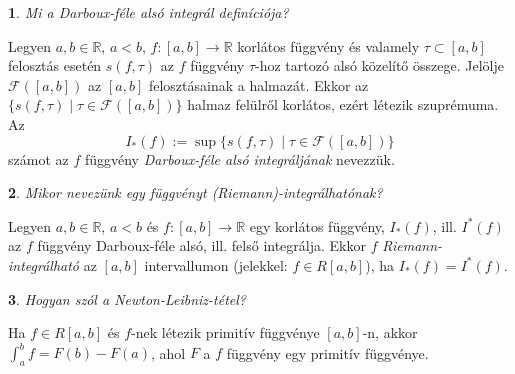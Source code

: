 \documentclass[a4paper]{article}
\def\R{\mathbb{R}}
\theoremstyle{qstyle}
\newtheorem{question}{}{}
\begin{document}
	\begin{question}
		Mi a \emph{Darboux-féle alsó integrál} definíciója?
	\end{question}
	Legyen $a,b \in \R$, $a<b$, $f:[a,b] \to \R$ korlátos függvény és valamely $\tau \subset [a,b]$ felosztás esetén $s(f,\tau)$ az $f$ függvény $\tau$-hoz tartozó alsó közelítő összege. Jelölje $\mathcal{F}([a,b])$ az $[a,b]$ felosztásainak a halmazát. Ekkor az $\{s(f,\tau) \mid \tau\in \mathcal{F}([a,b])\}$ halmaz felülről korlátos, ezért létezik szuprémuma. Az
	$$I_*(f) := \sup \{s(f,\tau) \mid \tau \in \mathcal{F}([a,b])\} $$
	számot az $f$ függvény \emph{Darboux-féle alsó integráljának} nevezzük.
	
	\begin{question}
		Mikor nevezünk egy függvényt (Riemann)-integrálhatónak?
	\end{question}
	Legyen $a,b \in \R$, $a < b$ és $f : [a,b] \to \R$ egy korlátos függvény, $I_*(f)$, ill. $I^*(f)$ az $f$ függvény Darboux-féle alsó, ill. felső integrálja. Ekkor $f$ \emph{Riemann-integrálható} az $[a,b]$ intervallumon (jelekkel: $f \in R[a,b]$), ha $I_*(f) = I^*(f)$.
	
	\begin{question}
		Hogyan szól a \emph{Newton-Leibniz-tétel}? 
	\end{question}
	Ha $f \in R[a,b]$ és $f$-nek létezik primitív függvénye $[a,b]$-n, akkor $\int_{a}^{b} f = F(b) - F(a)$, ahol $F$ a $f$ függvény egy primitív függvénye.
	
\end{document}
